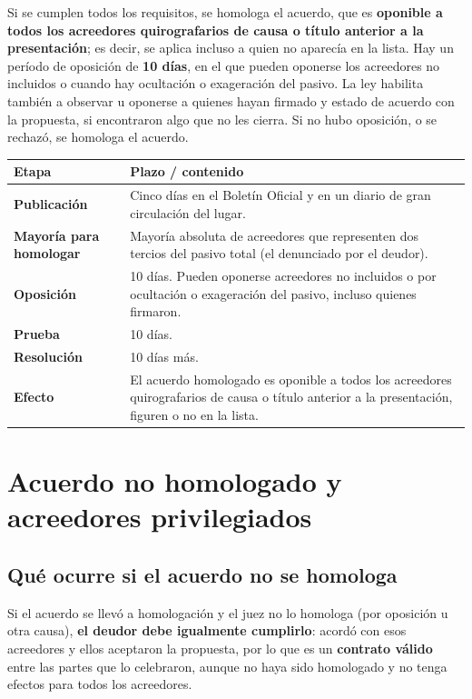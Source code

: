 \documentclass[12pt,oneside]{book}
\begin{document}
Si se cumplen todos los requisitos, se homologa el acuerdo, que es \textbf{oponible a todos los acreedores quirografarios de causa o título anterior a la presentación}; es decir, se aplica incluso a quien no aparecía en la lista. Hay un período de oposición de \textbf{10 días}, en el que pueden oponerse los acreedores no incluidos o cuando hay ocultación o exageración del pasivo. La ley habilita también a observar u oponerse a quienes hayan firmado y estado de acuerdo con la propuesta, si encontraron algo que no les cierra. Si no hubo oposición, o se rechazó, se homologa el acuerdo.

\begin{table}[H]
\centering
\small
\begin{tabularx}{\textwidth}{@{}>{\raggedright\arraybackslash}p{3.8cm}Y@{}}
\toprule
\textbf{Etapa} & \textbf{Plazo / contenido} \\
\midrule
\textbf{Publicación} & Cinco días en el Boletín Oficial y en un diario de gran circulación del lugar. \\
\textbf{Mayoría para homologar} & Mayoría absoluta de acreedores que representen dos tercios del pasivo total (el denunciado por el deudor). \\
\textbf{Oposición} & 10 días. Pueden oponerse acreedores no incluidos o por ocultación o exageración del pasivo, incluso quienes firmaron. \\
\textbf{Prueba} & 10 días. \\
\textbf{Resolución} & 10 días más. \\
\textbf{Efecto} & El acuerdo homologado es oponible a todos los acreedores quirografarios de causa o título anterior a la presentación, figuren o no en la lista. \\
\bottomrule
\end{tabularx}
\end{table}

\section{Acuerdo no homologado y acreedores privilegiados}

\subsection{Qué ocurre si el acuerdo no se homologa}

Si el acuerdo se llevó a homologación y el juez no lo homologa (por oposición u otra causa), \textbf{el deudor debe igualmente cumplirlo}: acordó con esos acreedores y ellos aceptaron la propuesta, por lo que es un \textbf{contrato válido} entre las partes que lo celebraron, aunque no haya sido homologado y no tenga efectos para todos los acreedores.
\end{document}
